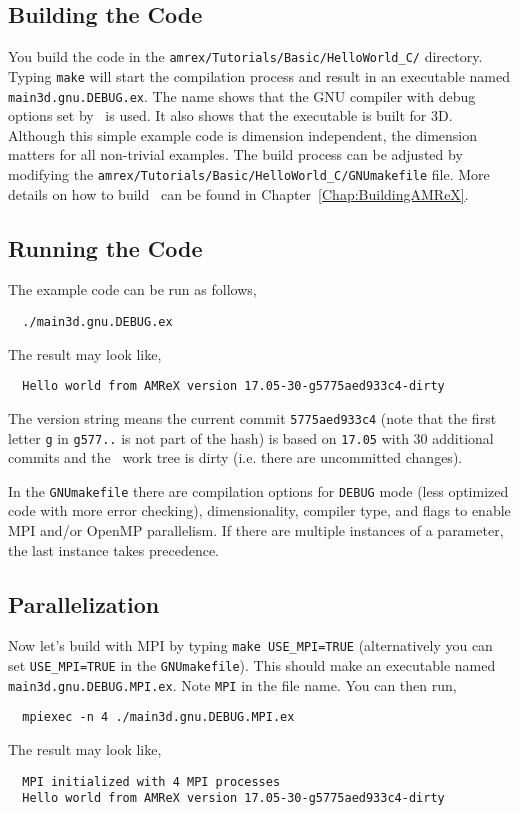 \subsection{Building the Code}

You build the code in the {\tt amrex/Tutorials/Basic/HelloWorld\_C/}
directory.  Typing {\tt make} will start the compilation process and
result in an executable named {\tt main3d.gnu.DEBUG.ex}.  The name
shows that the GNU compiler with debug options set by \amrex\ is used.
It also shows that the executable is built for 3D.  Although this
simple example code is dimension independent, the dimension matters
for all non-trivial examples.  The build process can be adjusted by
modifying the {\tt amrex/Tutorials/Basic/HelloWorld\_C/GNUmakefile} file.
More details on how to build \amrex\ can be found in
Chapter~\ref{Chap:BuildingAMReX}.

\subsection{Running the Code}

The example code can be run as follows,
\begin{verbatim}
  ./main3d.gnu.DEBUG.ex
\end{verbatim}
The result may look like,
\begin{verbatim}
  Hello world from AMReX version 17.05-30-g5775aed933c4-dirty
\end{verbatim}
The version string means the current commit {\tt 5775aed933c4} (note
that the first letter {\tt g} in {\tt g577..} is not part of the hash)
is based on {\tt 17.05} with 30 additional commits and the \amrex\
work tree is dirty (i.e. there are uncommitted changes).

In the {\tt GNUmakefile} there are compilation options for {\tt DEBUG}
mode (less optimized code with more error checking), dimensionality,
compiler type, and flags to enable MPI and/or OpenMP parallelism.
If there are multiple instances of a parameter, the last instance
takes precedence.

\subsection{Parallelization}

Now let's build with MPI by typing {\tt make USE\_MPI=TRUE} (alternatively
you can set {\tt USE\_MPI=TRUE} in the {\tt GNUmakefile}).  This
should make an executable named {\tt main3d.gnu.DEBUG.MPI.ex}.  Note
{\tt MPI} in the file name.  You can then run,
\begin{verbatim}
  mpiexec -n 4 ./main3d.gnu.DEBUG.MPI.ex
\end{verbatim}
The result may look like,
\begin{verbatim}
  MPI initialized with 4 MPI processes
  Hello world from AMReX version 17.05-30-g5775aed933c4-dirty
\end{verbatim}

